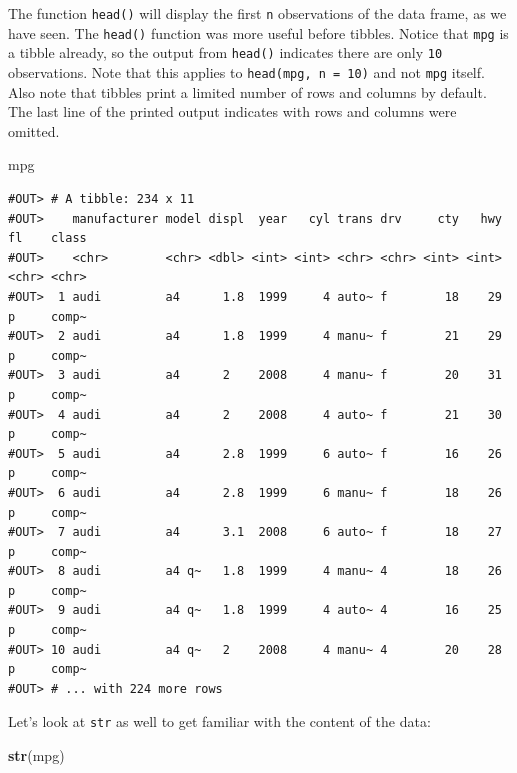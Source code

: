 \documentclass[]{book}
\newenvironment{Shaded}{\begin{snugshade}}{\end{snugshade}}
\newcommand{\KeywordTok}[1]{\textcolor[rgb]{0.13,0.29,0.53}{\textbf{#1}}}
\newcommand{\NormalTok}[1]{#1}
\begin{document}
The function \texttt{head()} will display the first \texttt{n} observations of the data frame, as we have seen. The \texttt{head()} function was more useful before tibbles. Notice that \texttt{mpg} is a tibble already, so the output from \texttt{head()} indicates there are only \texttt{10} observations. Note that this applies to \texttt{head(mpg,\ n\ =\ 10)} and not \texttt{mpg} itself. Also note that tibbles print a limited number of rows and columns by default. The last line of the printed output indicates with rows and columns were omitted.

\begin{Shaded}
\begin{Highlighting}[]
\NormalTok{mpg}
\end{Highlighting}
\end{Shaded}

\begin{verbatim}
#OUT> # A tibble: 234 x 11
#OUT>    manufacturer model displ  year   cyl trans drv     cty   hwy fl    class
#OUT>    <chr>        <chr> <dbl> <int> <int> <chr> <chr> <int> <int> <chr> <chr>
#OUT>  1 audi         a4      1.8  1999     4 auto~ f        18    29 p     comp~
#OUT>  2 audi         a4      1.8  1999     4 manu~ f        21    29 p     comp~
#OUT>  3 audi         a4      2    2008     4 manu~ f        20    31 p     comp~
#OUT>  4 audi         a4      2    2008     4 auto~ f        21    30 p     comp~
#OUT>  5 audi         a4      2.8  1999     6 auto~ f        16    26 p     comp~
#OUT>  6 audi         a4      2.8  1999     6 manu~ f        18    26 p     comp~
#OUT>  7 audi         a4      3.1  2008     6 auto~ f        18    27 p     comp~
#OUT>  8 audi         a4 q~   1.8  1999     4 manu~ 4        18    26 p     comp~
#OUT>  9 audi         a4 q~   1.8  1999     4 auto~ 4        16    25 p     comp~
#OUT> 10 audi         a4 q~   2    2008     4 manu~ 4        20    28 p     comp~
#OUT> # ... with 224 more rows
\end{verbatim}

Let's look at \texttt{str} as well to get familiar with the content of the data:

\begin{Shaded}
\begin{Highlighting}[]
\KeywordTok{str}\NormalTok{(mpg)}
\end{Highlighting}
\end{Shaded}
\end{document}
